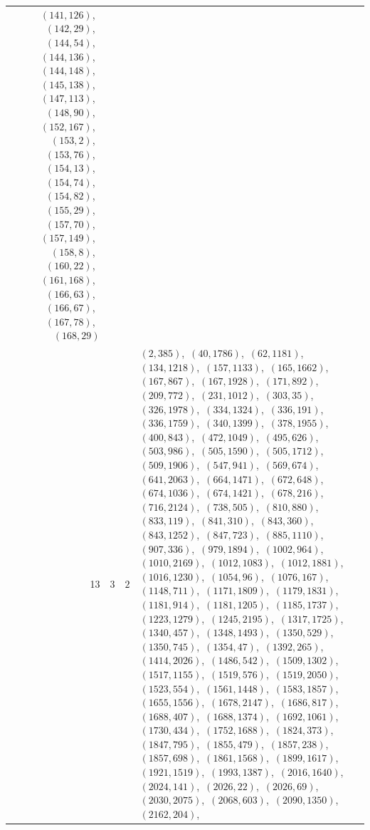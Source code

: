 \documentclass[11pt]{article}
\begin{document}
\begin{longtable}{@{}rrl>{\raggedright\arraybackslash}p{}@{}}
$(141,126)$,\allowbreak\ $(142,29)$,\allowbreak\ $(144,54)$,\allowbreak\ $(144,136)$,\allowbreak\ $(144,148)$,\allowbreak\ $(145,138)$,\allowbreak\ $(147,113)$,\allowbreak\ $(148,90)$,\allowbreak\ $(152,167)$,\allowbreak\ $(153,2)$,\allowbreak\ $(153,76)$,\allowbreak\ $(154,13)$,\allowbreak\ $(154,74)$,\allowbreak\ $(154,82)$,\allowbreak\ $(155,29)$,\allowbreak\ $(157,70)$,\allowbreak\ $(157,149)$,\allowbreak\ $(158,8)$,\allowbreak\ $(160,22)$,\allowbreak\ $(161,168)$,\allowbreak\ $(166,63)$,\allowbreak\ $(166,67)$,\allowbreak\ $(167,78)$,\allowbreak\ $(168,29)$\\
13 & 3 & $2$ & $(2,385)$,\allowbreak\ $(40,1786)$,\allowbreak\ $(62,1181)$,\allowbreak\ $(134,1218)$,\allowbreak\ $(157,1133)$,\allowbreak\ $(165,1662)$,\allowbreak\ $(167,867)$,\allowbreak\ $(167,1928)$,\allowbreak\ $(171,892)$,\allowbreak\ $(209,772)$,\allowbreak\ $(231,1012)$,\allowbreak\ $(303,35)$,\allowbreak\ $(326,1978)$,\allowbreak\ $(334,1324)$,\allowbreak\ $(336,191)$,\allowbreak\ $(336,1759)$,\allowbreak\ $(340,1399)$,\allowbreak\ $(378,1955)$,\allowbreak\ $(400,843)$,\allowbreak\ $(472,1049)$,\allowbreak\ $(495,626)$,\allowbreak\ $(503,986)$,\allowbreak\ $(505,1590)$,\allowbreak\ $(505,1712)$,\allowbreak\ $(509,1906)$,\allowbreak\ $(547,941)$,\allowbreak\ $(569,674)$,\allowbreak\ $(641,2063)$,\allowbreak\ $(664,1471)$,\allowbreak\ $(672,648)$,\allowbreak\ $(674,1036)$,\allowbreak\ $(674,1421)$,\allowbreak\ $(678,216)$,\allowbreak\ $(716,2124)$,\allowbreak\ $(738,505)$,\allowbreak\ $(810,880)$,\allowbreak\ $(833,119)$,\allowbreak\ $(841,310)$,\allowbreak\ $(843,360)$,\allowbreak\ $(843,1252)$,\allowbreak\ $(847,723)$,\allowbreak\ $(885,1110)$,\allowbreak\ $(907,336)$,\allowbreak\ $(979,1894)$,\allowbreak\ $(1002,964)$,\allowbreak\ $(1010,2169)$,\allowbreak\ $(1012,1083)$,\allowbreak\ $(1012,1881)$,\allowbreak\ $(1016,1230)$,\allowbreak\ $(1054,96)$,\allowbreak\ $(1076,167)$,\allowbreak\ $(1148,711)$,\allowbreak\ $(1171,1809)$,\allowbreak\ $(1179,1831)$,\allowbreak\ $(1181,914)$,\allowbreak\ $(1181,1205)$,\allowbreak\ $(1185,1737)$,\allowbreak\ $(1223,1279)$,\allowbreak\ $(1245,2195)$,\allowbreak\ $(1317,1725)$,\allowbreak\ $(1340,457)$,\allowbreak\ $(1348,1493)$,\allowbreak\ $(1350,529)$,\allowbreak\ $(1350,745)$,\allowbreak\ $(1354,47)$,\allowbreak\ $(1392,265)$,\allowbreak\ $(1414,2026)$,\allowbreak\ $(1486,542)$,\allowbreak\ $(1509,1302)$,\allowbreak\ $(1517,1155)$,\allowbreak\ $(1519,576)$,\allowbreak\ $(1519,2050)$,\allowbreak\ $(1523,554)$,\allowbreak\ $(1561,1448)$,\allowbreak\ $(1583,1857)$,\allowbreak\ $(1655,1556)$,\allowbreak\ $(1678,2147)$,\allowbreak\ $(1686,817)$,\allowbreak\ $(1688,407)$,\allowbreak\ $(1688,1374)$,\allowbreak\ $(1692,1061)$,\allowbreak\ $(1730,434)$,\allowbreak\ $(1752,1688)$,\allowbreak\ $(1824,373)$,\allowbreak\ $(1847,795)$,\allowbreak\ $(1855,479)$,\allowbreak\ $(1857,238)$,\allowbreak\ $(1857,698)$,\allowbreak\ $(1861,1568)$,\allowbreak\ $(1899,1617)$,\allowbreak\ $(1921,1519)$,\allowbreak\ $(1993,1387)$,\allowbreak\ $(2016,1640)$,\allowbreak\ $(2024,141)$,\allowbreak\ $(2026,22)$,\allowbreak\ $(2026,69)$,\allowbreak\ $(2030,2075)$,\allowbreak\ $(2068,603)$,\allowbreak\ $(2090,1350)$,\allowbreak\ $(2162,204)$,\allowbreak\ 
\end{longtable}
\end{document}
